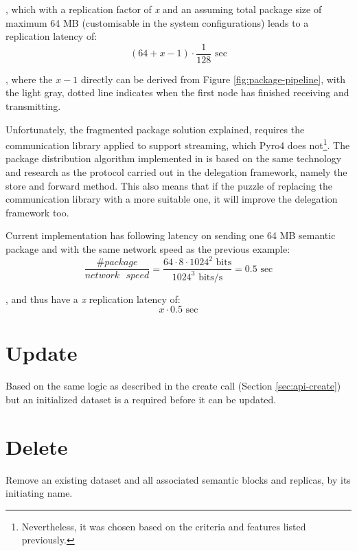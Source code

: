 , which with a replication factor of \textit{x} and an assuming total package size of maximum 64 MB (customisable in the system configurations) leads to a replication latency of:
\begin{equation}
	(64 + x - 1) \cdot \dfrac{1}{128} \text{ sec}
\end{equation}

, where the $x - 1$ directly can be derived from Figure \ref{fig:package-pipeline}, with the light gray, dotted line indicates when the first node has finished receiving and transmitting.
\newline

\noindent
Unfortunately, the fragmented package solution explained, requires the communication library applied to support streaming, which Pyro4 does not\footnote{Nevertheless, it was chosen based on the criteria and features listed previously.}. The package distribution algorithm implemented in \CodeName is based on the same technology and research as the protocol carried out in the delegation framework, namely the store and forward method. This also means that if the puzzle of replacing the communication library with a more suitable one, it will improve the delegation framework too.
\newline

Current implementation has following latency on sending one 64 MB semantic package and with the same network speed as the previous example:
\vspace*{1mm}
\begin{equation}
	\dfrac{\texttt{\#}package}{network\text{ }speed} = \dfrac{64\cdot 8\cdot 1024^2 \text{ bits}}{1024^3 \text{ bits/s}} = 0.5 \text{ sec}
\end{equation}
\vspace*{2mm}

\noindent
, and thus have a \textit{x} replication latency of:
\begin{equation}
	x \cdot 0.5 \text{ sec}
\end{equation}
 
\section{Update}
Based on the same logic as described in the create call (Section \ref{sec:api-create}) but an initialized dataset is a required before it can be updated.

\section{Delete}
Remove an existing dataset and all associated semantic blocks and replicas, by its 	initiating name.

